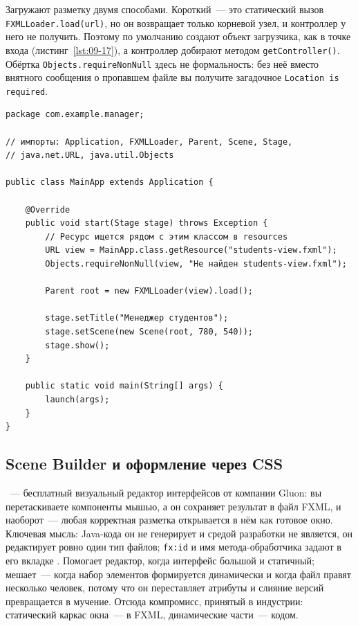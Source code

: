 Загружают разметку двумя способами. Короткий~--- это статический вызов
\texttt{FXMLLoader.load(url)}, но он возвращает только корневой узел, и
контроллер у него не получить. Поэтому по умолчанию создают объект загрузчика,
как в точке входа (листинг~\ref{lst:09-17}), а контроллер добирают методом
\texttt{getController()}. Обёртка \texttt{Objects.requireNonNull} здесь не
формальность: без неё вместо внятного сообщения о пропавшем файле вы получите
загадочное \texttt{Location is required}.

\begin{listing}[H]
\begin{verbatim}
package com.example.manager;

// импорты: Application, FXMLLoader, Parent, Scene, Stage,
// java.net.URL, java.util.Objects

public class MainApp extends Application {

    @Override
    public void start(Stage stage) throws Exception {
        // Ресурс ищется рядом с этим классом в resources
        URL view = MainApp.class.getResource("students-view.fxml");
        Objects.requireNonNull(view, "Не найден students-view.fxml");

        Parent root = new FXMLLoader(view).load();

        stage.setTitle("Менеджер студентов");
        stage.setScene(new Scene(root, 780, 540));
        stage.show();
    }

    public static void main(String[] args) {
        launch(args);
    }
}
\end{verbatim}
\caption{Точка входа: класс MainApp}
\label{lst:09-17}
\end{listing}

\subsection{Scene Builder и оформление через CSS}

~--- бесплатный визуальный редактор интерфейсов от
компании Gluon: вы перетаскиваете компоненты мышью, а он сохраняет результат в
файл FXML, и наоборот~--- любая корректная разметка открывается в нём как
готовое окно. Ключевая мысль: Java-кода он не генерирует и средой разработки не
является, он редактирует ровно один тип файлов; \texttt{fx:id} и имя
метода-обработчика задают в его вкладке . Помогает редактор, когда
интерфейс большой и статичный; мешает~--- когда набор элементов формируется
динамически и когда файл правят несколько человек, потому что он переставляет
атрибуты и слияние версий превращается в мучение. Отсюда компромисс, принятый в
индустрии: статический каркас окна~--- в FXML, динамические части~--- кодом.

